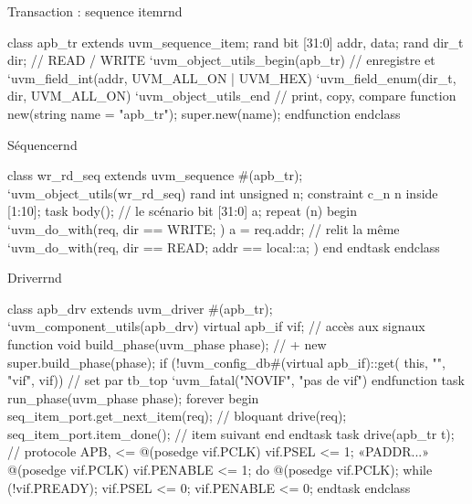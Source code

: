 \documentclass{article}
\begin{document}
\begin{colonne}[stimulus][col-b]
\begin{bloc}{Transaction : sequence item}{rnd}
\begin{code}
class apb_tr extends uvm_sequence_item;
  rand bit [31:0] addr, data;
  rand dir_t      dir;             // READ / WRITE
  `uvm_object_utils_begin(apb_tr)  // enregistre et
    `uvm_field_int(addr, UVM_ALL_ON | UVM_HEX)
    `uvm_field_enum(dir_t, dir, UVM_ALL_ON)
  `uvm_object_utils_end            // print, copy, compare
  function new(string name = "apb_tr");
    super.new(name);
  endfunction
endclass
\end{code}
\end{bloc}

\begin{bloc}{Séquence}{rnd}
\begin{code}
class wr_rd_seq extends uvm_sequence #(apb_tr);
  `uvm_object_utils(wr_rd_seq)
  rand int unsigned n;
  constraint c_n { n inside {[1:10]}; }
  task body();                     // le scénario
    bit [31:0] a;
    repeat (n) begin
      `uvm_do_with(req, { dir == WRITE; })
      a = req.addr;                // relit la même
      `uvm_do_with(req, { dir == READ;
                          addr == local::a; })
    end
  endtask
endclass
\end{code}
\end{bloc}

\begin{bloc}{Driver}{rnd}
\begin{code}
class apb_drv extends uvm_driver #(apb_tr);
  `uvm_component_utils(apb_drv)
  virtual apb_if vif;              // accès aux signaux
  function void build_phase(uvm_phase phase);   // + new
    super.build_phase(phase);
    if (!uvm_config_db#(virtual apb_if)::get(
          this, "", "vif", vif))   // set par tb_top
      `uvm_fatal("NOVIF", "pas de vif")
  endfunction
  task run_phase(uvm_phase phase);
    forever begin
      seq_item_port.get_next_item(req);  // bloquant
      drive(req);
      seq_item_port.item_done();         // item suivant
    end
  endtask
  task drive(apb_tr t);            // protocole APB, <=
    @(posedge vif.PCLK) vif.PSEL <= 1;  «PADDR...»
    @(posedge vif.PCLK) vif.PENABLE <= 1;
    do @(posedge vif.PCLK); while (!vif.PREADY);
    vif.PSEL <= 0;  vif.PENABLE <= 0;
  endtask
endclass
\end{code}
\end{bloc}
\end{colonne}\colbreak
\end{document}
